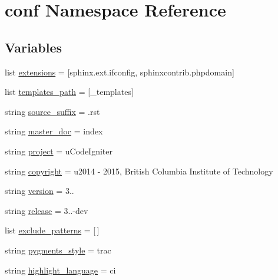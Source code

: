 \hypertarget{namespaceconf}{}\section{conf Namespace Reference}
\label{namespaceconf}
\subsection*{Variables}
\begin{DoxyCompactItemize}
\item 
list \hyperlink{namespaceconf_ac2adb9cb4fae2807baaf6a3fb59cbebb}{extensions} = \mbox{[}\textquotesingle{}sphinx.\+ext.\+ifconfig\textquotesingle{}, \textquotesingle{}sphinxcontrib.\+phpdomain\textquotesingle{}\mbox{]}
\item 
list \hyperlink{namespaceconf_af5fc85fd05db5329f792629094fdd12c}{templates\+\_\+path} = \mbox{[}\textquotesingle{}\+\_\+templates\textquotesingle{}\mbox{]}
\item 
string \hyperlink{namespaceconf_ab5a6e10918566e45dfbea4f058e904f9}{source\+\_\+suffix} = \textquotesingle{}.rst\textquotesingle{}
\item 
string \hyperlink{namespaceconf_a87edce364655e617d4eea122c1c5db0a}{master\+\_\+doc} = \textquotesingle{}index\textquotesingle{}
\item 
string \hyperlink{namespaceconf_a0af1c0d59538118611a1d7a6d8b45956}{project} = u\textquotesingle{}Code\+Igniter\textquotesingle{}
\item 
string \hyperlink{namespaceconf_a6ad5f3290c14149f679301b770fa13f9}{copyright} = u\textquotesingle{}2014 -\/ 2015, British Columbia Institute of Technology\textquotesingle{}
\item 
string \hyperlink{namespaceconf_af9c8593b58583463efe6932e24c9d6e6}{version} = \textquotesingle{}3..\textquotesingle{}
\item 
string \hyperlink{namespaceconf_a82643d1a47993da158506ac788f70fc4}{release} = \textquotesingle{}3..-\/dev\textquotesingle{}
\item 
list \hyperlink{namespaceconf_a16535c83d9b5c141382335d79b4995b2}{exclude\+\_\+patterns} = \mbox{[}$\,$\mbox{]}
\item 
string \hyperlink{namespaceconf_a55caf0e3a3760b53be9bc254d13dfbf2}{pygments\+\_\+style} = \textquotesingle{}trac\textquotesingle{}
\item 
string \hyperlink{namespaceconf_aac4c1ec5a0ad1f5e9db6b48bcf2f8415}{highlight\+\_\+language} = \textquotesingle{}ci\textquotesingle{}
\item 

\end{DoxyCompactItemize}
